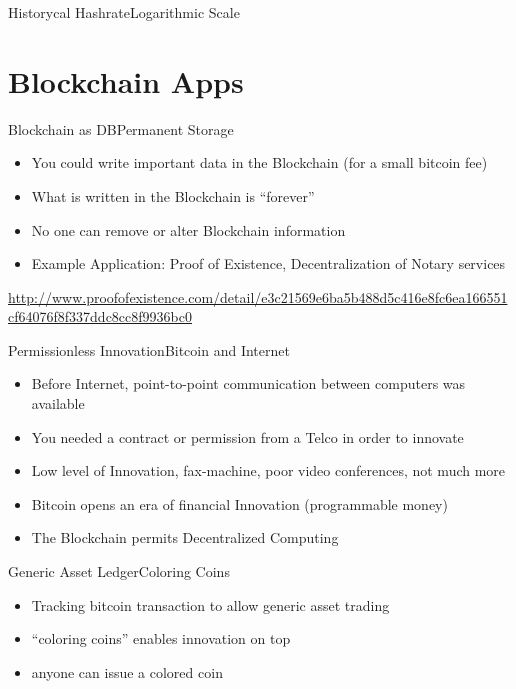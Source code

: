 \documentclass[english,compress]{beamer}
\begin{document}
\begin{frame}{Historycal Hashrate}{Logarithmic Scale}
\end{frame}

\section{Blockchain Apps}

\begin{frame}{Blockchain as DB}{Permanent Storage}
\begin{itemize}
 \item You could write important data in the Blockchain (for a small bitcoin fee)
 \item What is written in the Blockchain is ``forever''
 \item No one can remove or alter Blockchain information
 \item Example Application: Proof of Existence, Decentralization of Notary services 
\end{itemize}
 
\begin{tiny}
 \url{http://www.proofofexistence.com/detail/e3c21569e6ba5b488d5c416e8fc6ea166551cf64076f8f337ddc8cc8f9936bc0}
\end{tiny}
\end{frame}

\begin{frame}{Permissionless Innovation}{Bitcoin and Internet}
\begin{itemize}
 \item Before Internet, point-to-point communication between computers was available
 \item You needed a contract or permission from a Telco in order to innovate
 \item Low level of Innovation, fax-machine, poor video conferences, not much more
 \item Bitcoin opens an era of financial Innovation (programmable money)
 \item The Blockchain permits Decentralized Computing
\end{itemize}
\end{frame}



\begin{frame}{Generic Asset Ledger}{Coloring Coins}
\begin{itemize}
\item Tracking bitcoin transaction to allow generic asset trading
\item ``coloring coins'' enables innovation on top
\item anyone can issue a colored coin
\end{itemize}
\vfill
{}
\end{frame}
\end{document}
